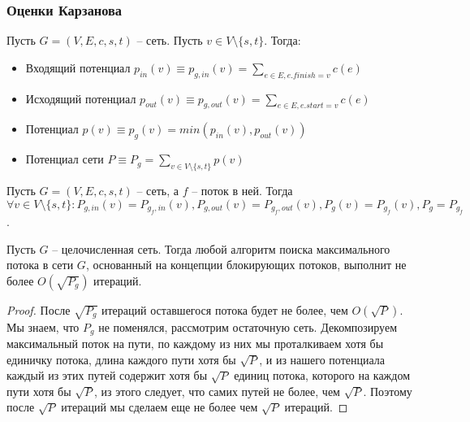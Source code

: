 


\subsubsection{Оценки Карзанова}

\begin{definition}
    Пусть $G = (V, E, c, s, t)$ -- сеть. Пусть $v \in V \setminus \{s, t\}$. Тогда:
    \begin{itemize}
        \item Входящий потенциал $p_{in}(v) \equiv p_{g, in}(v) = \sum_{e \in E, e.finish = v}c(e)$
        \item Исходящий потенциал $p_{out}(v) \equiv p_{g, out}(v) = \sum_{e \in E, e.start = v}c(e)$
        \item Потенциал $p(v) \equiv p_{g}(v) = min(p_{in}(v), p_{out}(v))$
        \item Потенциал сети $P \equiv P_{g} = \sum_{v \in V \setminus \{s, t\}}p(v)$
    \end{itemize}
\end{definition}

\begin{lemma}
    Пусть $G = (V, E, c, s, t)$ -- сеть, а $f$ -- поток в ней. Тогда $\forall v \in V \setminus \{s, t\}: P_{g, in}(v) = P_{g_f, in}(v), P_{g, out}(v) = P_{g_f, out}(v), P_g(v) = P_{g_f}(v), P_g = P_{g_f}$.
\end{lemma}

\begin{theorem}
    Пусть $G$ -- целочисленная сеть. Тогда любой алгоритм поиска максимального потока в сети $G$, основанный на концепции блокирующих потоков, выполнит не более $O(\sqrt{P_g})$ итераций.
\end{theorem}

\begin{proof}
    После $\sqrt{P_g}$ итераций оставшегося потока будет не более, чем $O(\sqrt{P})$. Мы знаем, что $P_g$ не поменялся, рассмотрим остаточную сеть. Декомпозируем максимальный поток на пути, по каждому из них мы проталкиваем хотя бы единичку потока, длина каждого пути хотя бы $\sqrt{P}$, и из нашего потенциала каждый из этих путей содержит хотя бы $\sqrt{P}$ единиц потока, которого на каждом пути хотя бы $\sqrt{P}$, из этого следует, что самих путей не более, чем $\sqrt{P}$. Поэтому после $\sqrt{P}$ итераций мы сделаем еще не более чем $\sqrt{P}$ итераций.
\end{proof}

